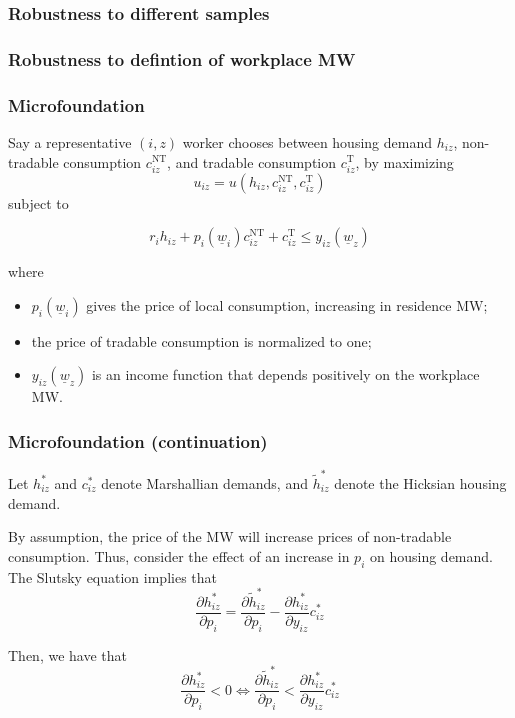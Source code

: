 \documentclass[aspectratio=169, t]{beamer}
\newcommand{\MW}{\underline{w}}
\begin{document}
\begin{frame}[label = robustness_sample]
	\frametitle{Robustness to different samples}
	
	
	
	\hyperlink{robus_sample}{}
\end{frame}

\begin{frame}[label = robustness_exp_mw]
	\frametitle{Robustness to defintion of workplace MW}
	
	
	
	\hyperlink{robus_sample}{}
\end{frame}

\begin{frame}[label = microfound]
	\frametitle{Microfoundation}
	Say a representative $(i,z)$ worker chooses between housing demand $h_{iz}$,
	non-tradable consumption $c^{\text{NT}}_{iz}$, and tradable consumption $c^{\text{T}}_{iz}$,
	by maximizing
	\[
	u_{iz} = u \left(h_{iz}, c^{\text{NT}}_{iz}, c^{\text{T}}_{iz}\right)
	\]
	subject to

	\[
	r_i h_{iz} + p_i(\MW_i) c^{\text{NT}}_{iz} + c^{\text{T}}_{iz} \leq y_{iz}(\MW_z)
	\]

	where 
	\begin{itemize}
		\item $p_i(\MW_i)$ gives the price of local consumption, increasing in residence MW;
		\item the price of tradable consumption is normalized to one;  
		\item $y_{iz}(\MW_z)$ is an income function that depends positively on the workplace MW.
	\end{itemize}
\end{frame}

\begin{frame}
	\frametitle{Microfoundation (continuation)}

	Let $h_{iz}^*$ and $c_{iz}^*$ denote Marshallian demands, and 
	$\tilde h_{iz}^*$ denote the Hicksian housing demand.

	\vspace{2mm}

	By assumption, the price of the MW will increase prices of non-tradable consumption.
	Thus, consider the effect of an increase in $p_i$ on housing demand.
	The Slutsky equation implies that
	\[
	\frac{\partial h_{iz}^*}{\partial p_i} 
	= \frac{\partial \tilde h_{iz}^*}{\partial p_i} 
	- \frac{\partial h_{iz}^*}{\partial y_{iz}} c_{iz}^*
	\]

	Then, we have that 
	\[
	\frac{\partial h_{iz}^*}{\partial p_i} < 0 \iff 
	\frac{\partial \tilde h_{iz}^*}{\partial p_i} 
	< \frac{\partial h_{iz}^*}{\partial y_{iz}} c_{iz}^*
	\]

	\hyperlink{discuss4}{}
\end{frame}
\end{document}

